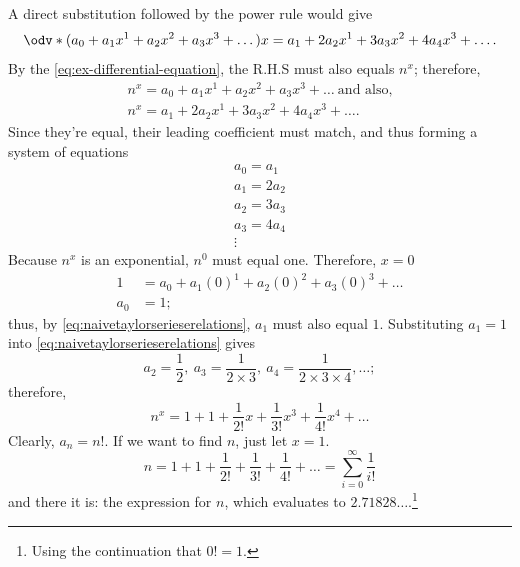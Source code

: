 A direct substitution followed by the power rule would give
\begin{equation}
	\odv*{(a_0 + a_1x^1 + a_2x^2 + a_3x^3 + \dots)}{x} = a_1 + 2a_2x^1 + 3a_3x^2 + 4a_4x^3 + \dots.
\end{equation}
By the \cref{eq:ex-differential-equation}, the R.H.S must also equals $n^x$; therefore,
\begin{equation}
	\begin{multlined}
		n^x = a_0 + a_1x^1 + a_2x^2 + a_3x^3 + \dots ~\textrm{and also,} \\
		n^x = a_1 + 2a_2x^1 + 3a_3x^2 + 4a_4x^3 + \dots.
	\end{multlined}
\end{equation}
Since they're equal, their leading coefficient must match, and thus forming a system of equations
\begin{equation}
	\begin{array}{c}
		a_0 = a_1 \\ a_1 = 2a_2 \\ a_2 = 3a_3 \\ a_3 = 4a_4 \\ \vdots
	\end{array}\label{eq:naivetaylorserieserelations}
\end{equation}
Because $n^x$ is an exponential, $n^0$ must equal one. Therefore, $x = 0$
\begin{align*}
	1   & = a_0 + a_1(0)^1 + a_2(0)^2 + a_3(0)^3 + \dots \\
	a_0 & = 1;
\end{align*}
thus, by \cref{eq:naivetaylorserieserelations}, $a_1$ must also equal $1$. Substituting $a_1 = 1$ into \cref{eq:naivetaylorserieserelations} gives
\begin{equation}
	a_2 = \frac{1}{2},~a_3 = \frac{1}{2 \times 3},~a_4 = \frac{1}{2 \times 3 \times 4}, \dots;
\end{equation}
therefore,
\begin{equation*}
	n^x = 1 + 1 + \frac{1}{2!}x + \frac{1}{3!}x^3 + \frac{1}{4!}x^4 + \dots
\end{equation*}
Clearly, $a_n = n!$. If we want to find $n$, just let $x = 1$.
\begin{equation*}
	n = 1 + 1 + \frac{1}{2!} + \frac{1}{3!} + \frac{1}{4!} + \dots = \sum_{i = 0}^{\infty}\frac{1}{i!}
\end{equation*}
and there it is: the expression for $n$, which evaluates to $2.71828\dots$.\footnote{Using the continuation that $0! = 1$.}

